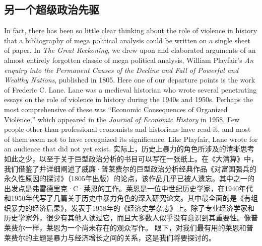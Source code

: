 \subsection{另一个超级政治先驱}
\begin{paracol}{2}
	In fact, there has been so little clear thinking about the role of violence in history that a bibliography of mega political analysis could be written on a single sheet of paper. In \emph{The Great Reckoning}, we drew upon and elaborated arguments of an almost entirely forgotten classic of mega political analysis, William Playfair's \emph{An enquiry into the Permanent Causes of the Decline and Fall of Powerful and Wealthy Nations}, published in 1805. Here one of our departure points is the work of Frederic C. Lane. Lane was a medieval historian who wrote several penetrating essays on the role of violence in history during the 1940s and 1950s. Perhaps the most comprehensive of these was ``Economic Consequences of Organized Violence,'' which appeared in the \emph{Journal of Economic History} in 1958. Few people other than professional economists and historians have read it, and most of them seem not to have recognized its significance. Like Playfair, Lane wrote for an audience that did not yet exist.
	\switchcolumn
	实际上，历史上暴力的角色所涉及的清晰思考如此之少，以至于关于巨型政治分析的书目可以写在一张纸上。在《大清算》中，我们借鉴了并详细阐述了威廉·普莱费尔的巨型政治分析经典作品《对富国强兵的永久性原因的探讨》（1805年出版）的论点，该作品几乎已被人遗忘。其中之一的出发点是弗雷德里克·C·莱恩的工作。莱恩是一位中世纪历史学家，在1940年代和1950年代写了几篇关于历史中暴力角色的深入研究论文。其中最全面的是《有组织暴力的经济后果》，发表于1958年的《经济史学杂志》上。除了专业经济学家和历史学家外，很少有其他人读过它，而且大多数人似乎没有意识到其重要性。像普莱费尔一样，莱恩为一个尚未存在的观众写作。 眼下，对我们最有用的莱恩和普莱费尔的主题是暴力与经济增长之间的关系，这是我们将要探讨的。
\end{paracol}

